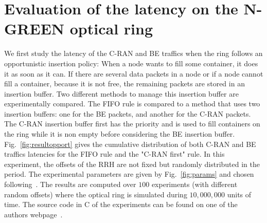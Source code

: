\documentclass[]{llncs}
\begin{document}
   \section{Evaluation of the latency on the N-GREEN optical ring}
   \label{sec:oportmethods}
   
   
  We first study the latency of the C-RAN and BE traffics when the ring follows an opportunistic insertion policy: When a node wants to fill some container, it does it as soon as it can. 
  If there are several data packets in a node or if a node cannot fill a container, because it is not free, 
  the remaining packets are stored in an insertion buffer. Two different methods to manage this insertion buffer are experimentally compared. The FIFO rule is compared to a method that uses two insertion buffers: one for the BE packets, and another for the C-RAN packets. The C-RAN insertion buffer first has the priority and is used to fill containers on the ring while it is non empty before considering the BE insertion buffer.  Fig.~\ref{fig:resultopport} gives the cumulative distribution of both C-RAN and BE traffics latencies for the FIFO rule and the "C-RAN first" rule. In this experiment, the offsets of the RRH are not fixed but randomly distributed in the period. The experimental parameters are given by Fig.~\ref{fig:params} and chosen following~\cite{ngreenarchitecture}. The results are computed over $100$ experiments (with different random offsets) where the optical ring is simulated during $10,000,000$ units of time. The source code in C of the experiments can be found on one of the authors webpage~\cite{webpage}.
  
\end{document}
